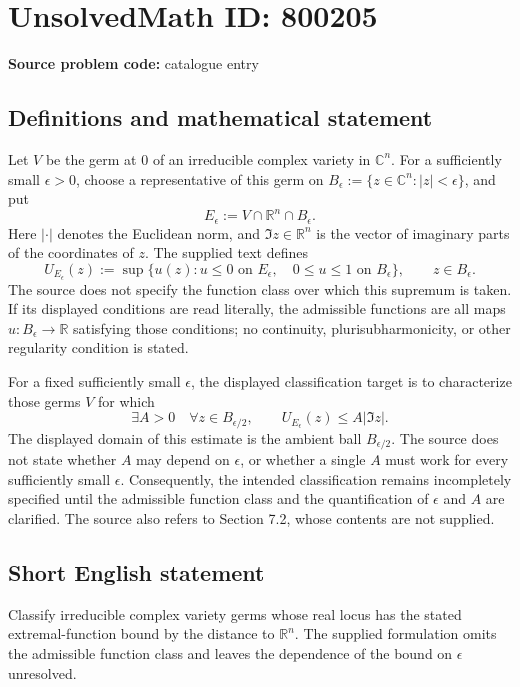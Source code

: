 \documentclass[11pt]{article}
\newcommand{\R}{\mathbb{R}}
\newcommand{\C}{\mathbb{C}}
\begin{document}
\section*{UnsolvedMath ID: 800205}
\textbf{Source problem code:} catalogue entry
\subsection{Definitions and mathematical statement}
Let \(V\) be the germ at \(0\) of an irreducible complex variety in \(\C^n\). For a sufficiently small \(\epsilon>0\), choose a representative of this germ on \(B_\epsilon:=\{z\in\C^n:|z|<\epsilon\}\), and put
\[
E_\epsilon:=V\cap\R^n\cap B_\epsilon.
\]
Here \(|\cdot|\) denotes the Euclidean norm, and \(\Im z\in\R^n\) is the vector of imaginary parts of the coordinates of \(z\). The supplied text defines
\[
U_{E_\epsilon}(z):=\sup\bigl\{u(z):u\leq0\text{ on }E_\epsilon,\quad 0\leq u\leq1\text{ on }B_\epsilon\bigr\},\qquad z\in B_\epsilon.
\]
The source does not specify the function class over which this supremum is taken. If its displayed conditions are read literally, the admissible functions are all maps \(u:B_\epsilon\to\R\) satisfying those conditions; no continuity, plurisubharmonicity, or other regularity condition is stated.

For a fixed sufficiently small \(\epsilon\), the displayed classification target is to characterize those germs \(V\) for which
\[
\exists A>0\quad\forall z\in B_{\epsilon/2},\qquad U_{E_\epsilon}(z)\leq A|\Im z|.\tag{\(\alpha\)}
\]
The displayed domain of this estimate is the ambient ball \(B_{\epsilon/2}\). The source does not state whether \(A\) may depend on \(\epsilon\), or whether a single \(A\) must work for every sufficiently small \(\epsilon\). Consequently, the intended classification remains incompletely specified until the admissible function class and the quantification of \(\epsilon\) and \(A\) are clarified. The source also refers to Section 7.2, whose contents are not supplied.
\subsection{Short English statement}
Classify irreducible complex variety germs whose real locus has the stated extremal-function bound by the distance to \(\R^n\). The supplied formulation omits the admissible function class and leaves the dependence of the bound on \(\epsilon\) unresolved.
\end{document}
